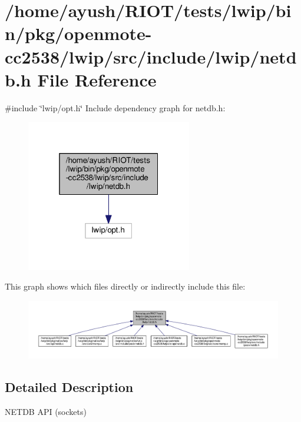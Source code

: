 \hypertarget{openmote-cc2538_2lwip_2src_2include_2lwip_2netdb_8h}{}\section{/home/ayush/\+R\+I\+O\+T/tests/lwip/bin/pkg/openmote-\/cc2538/lwip/src/include/lwip/netdb.h File Reference}
\label{openmote-cc2538_2lwip_2src_2include_2lwip_2netdb_8h}
{\ttfamily \#include \char`\"{}lwip/opt.\+h\char`\"{}}\newline
Include dependency graph for netdb.\+h\+:
\nopagebreak
\begin{figure}[H]
\begin{center}
\leavevmode
\includegraphics[width=205pt]{openmote-cc2538_2lwip_2src_2include_2lwip_2netdb_8h__incl}
\end{center}
\end{figure}
This graph shows which files directly or indirectly include this file\+:
\nopagebreak
\begin{figure}[H]
\begin{center}
\leavevmode
\includegraphics[width=350pt]{openmote-cc2538_2lwip_2src_2include_2lwip_2netdb_8h__dep__incl}
\end{center}
\end{figure}


\subsection{Detailed Description}
N\+E\+T\+DB A\+PI (sockets) 